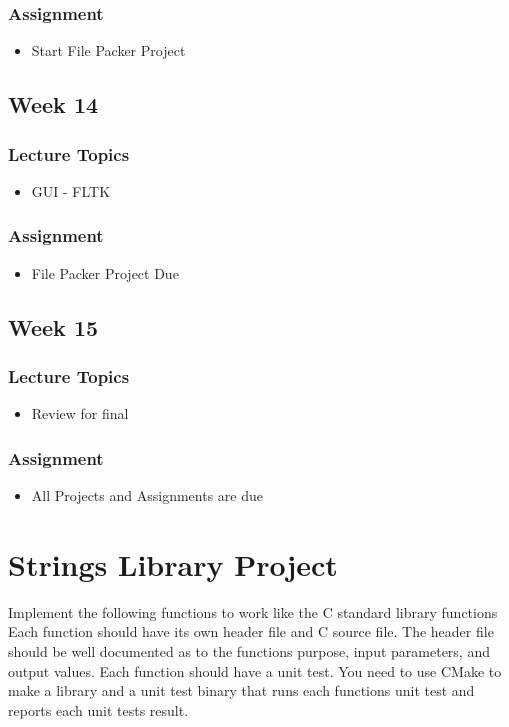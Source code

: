 \documentclass[a4paper,12pt]{report}
\begin{document}
\subsubsection*{Assignment}
\begin{itemize}
\item Start File Packer Project
\end{itemize}

\subsection*{Week 14}
\subsubsection*{Lecture Topics}
\begin{itemize}
\item GUI - FLTK
\end{itemize}
\subsubsection*{Assignment}
\begin{itemize}
\item File Packer Project Due
\end{itemize}


\subsection*{Week 15}
\subsubsection*{Lecture Topics}
\begin{itemize}
\item Review for final 
\end{itemize}
\subsubsection*{Assignment}
\begin{itemize}
\item All Projects and Assignments are due
\end{itemize}



\pagebreak
\section*{Strings Library Project}
Implement the following functions to work like the C standard library functions  Each function should have its own header file and C source file.  The header file should be well documented as to the functions purpose, input parameters, and output values.  Each function should have a unit test.  You need to use CMake to make a library and a unit test binary that runs each functions unit test and reports each unit tests result.
\end{document}
